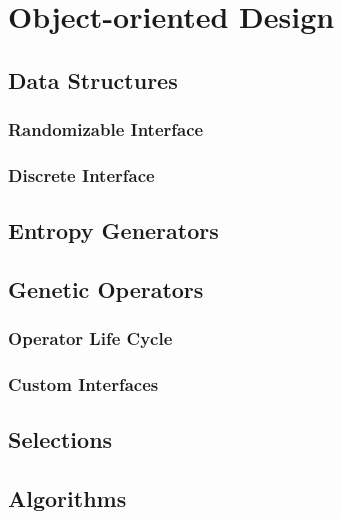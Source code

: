 \chapter{Object-oriented Design}
\cite{Andel07}
\todo

\section{Data Structures}
\todo

\subsection{Randomizable Interface}
\todo

\subsection{Discrete Interface}
\todo

\section{Entropy Generators}
\todo

\section{Genetic Operators}
\todo

\subsection{Operator Life Cycle}
\todo

\subsection{Custom Interfaces}
\todo

\section{Selections}
\todo

\section{Algorithms}
\todo
